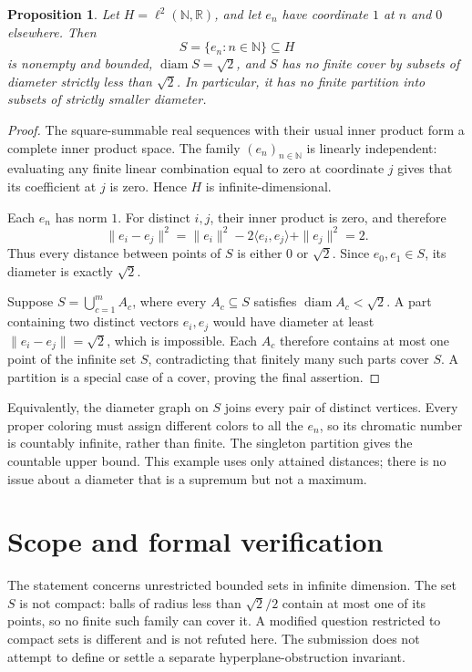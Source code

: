 \documentclass[11pt]{article}
\newtheorem{proposition}{Proposition}
\newcommand{\diam}{\operatorname{diam}}
\begin{document}
\begin{proposition}
Let $H=\ell^2(\mathbb N,\mathbb R)$, and let $e_n$ have coordinate $1$ at $n$ and $0$ elsewhere. Then
\[
 S=\{e_n:n\in\mathbb N\}\subseteq H
\]
is nonempty and bounded, $\diam S=\sqrt2$, and $S$ has no finite cover by subsets of diameter strictly less than $\sqrt2$. In particular, it has no finite partition into subsets of strictly smaller diameter.
\end{proposition}
\begin{proof}
The square-summable real sequences with their usual inner product form a complete inner product space. The family $(e_n)_{n\in\mathbb N}$ is linearly independent: evaluating any finite linear combination equal to zero at coordinate $j$ gives that its coefficient at $j$ is zero. Hence $H$ is infinite-dimensional.

Each $e_n$ has norm $1$. For distinct $i,j$, their inner product is zero, and therefore
\[
 \|e_i-e_j\|^2=\|e_i\|^2-2\langle e_i,e_j\rangle+\|e_j\|^2=2.
\]
Thus every distance between points of $S$ is either $0$ or $\sqrt2$. Since $e_0,e_1\in S$, its diameter is exactly $\sqrt2$.

Suppose $S=\bigcup_{c=1}^m A_c$, where every $A_c\subseteq S$ satisfies $\diam A_c<\sqrt2$. A part containing two distinct vectors $e_i,e_j$ would have diameter at least $\|e_i-e_j\|=\sqrt2$, which is impossible. Each $A_c$ therefore contains at most one point of the infinite set $S$, contradicting that finitely many such parts cover $S$. A partition is a special case of a cover, proving the final assertion.
\end{proof}

Equivalently, the diameter graph on $S$ joins every pair of distinct vertices. Every proper coloring must assign different colors to all the $e_n$, so its chromatic number is countably infinite, rather than finite. The singleton partition gives the countable upper bound. This example uses only attained distances; there is no issue about a diameter that is a supremum but not a maximum.

\section*{Scope and formal verification}
The statement concerns unrestricted bounded sets in infinite dimension. The set $S$ is not compact: balls of radius less than $\sqrt2/2$ contain at most one of its points, so no finite such family can cover it. A modified question restricted to compact sets is different and is not refuted here. The submission does not attempt to define or settle a separate hyperplane-obstruction invariant.
\end{document}
